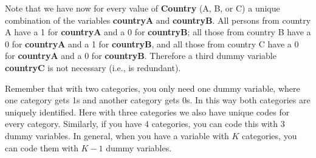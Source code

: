 \documentclass[]{book}\usepackage[]{graphicx}\usepackage[]{color}
\begin{document}
Note that we have now for every value of \textbf{Country} (A, B, or C) a unique combination of the variables \textbf{countryA} and \textbf{countryB}. All persons from country A have a 1 for \textbf{countryA} and a 0 for \textbf{countryB}; all those from country B have a 0 for \textbf{countryA} and a 1 for \textbf{countryB}, and all those from country C have a 0 for \textbf{countryA} and a 0 for \textbf{countryB}. Therefore a third dummy variable \textbf{countryC} is not necessary (i.e., is redundant). 

Remember that with two categories, you only need one dummy variable, where one category gets 1s and another category gets 0s. In this way both categories are uniquely identified. Here with three categories we also have unique codes for every category. Similarly, if you have 4 categories, you can code this with 3 dummy variables. In general, when you have a variable with $K$ categories, you can code them with $K-1$ dummy variables.
\end{document}
